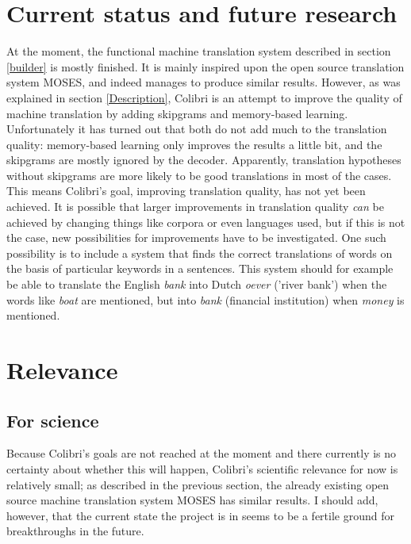 \documentclass[12pt]{article}
\begin{document}
\section{Current status and future research}

At the moment, the functional machine translation system described in section \ref{builder} is mostly finished. It is mainly inspired upon the open source translation system MOSES, and indeed manages to produce similar results. However, as was explained in section \ref{Description}, Colibri is an attempt to improve the quality of machine translation by adding skipgrams and memory-based learning. Unfortunately it has turned out that both do not add much to the translation quality: memory-based learning only improves the results a little bit, and the skipgrams are mostly ignored by the decoder. Apparently, translation hypotheses without skipgrams are more likely to be good translations in most of the cases. \\\indent
This means Colibri's goal, improving translation quality, has not yet been achieved. It is possible that larger improvements in translation quality \emph{can} be achieved by changing things like corpora or even languages used, but if this is not the case, new possibilities for improvements have to be investigated. One such possibility is to include a system that finds the correct translations of words on the basis of particular keywords in a sentences. This system should for example be able to translate the English \emph{bank} into Dutch \emph{oever} ('river bank') when the words like \emph{boat} are mentioned, but into \emph{bank} (financial institution) when \emph{money} is mentioned.




\section{Relevance}

\subsection{For science}

Because Colibri's goals are not reached at the moment and there currently is no certainty about whether this will happen, Colibri's scientific relevance for now is relatively small; as described in the previous section, the already existing open source machine translation system MOSES has similar results. I should add, however, that the current state the project is in seems to be a fertile ground for breakthroughs in the future. 
\end{document}
